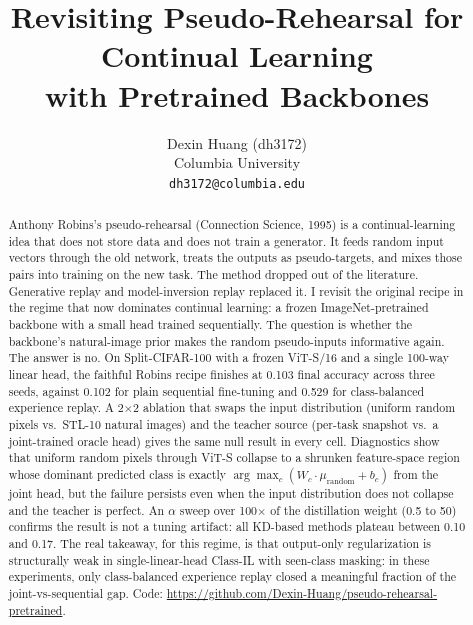 \documentclass[conference]{IEEEtran}
\begin{document}
\title{Revisiting Pseudo-Rehearsal for Continual Learning\\with Pretrained Backbones}

\author{Dexin Huang (dh3172)\\
Columbia University\\
\texttt{dh3172@columbia.edu}}

\maketitle

\begin{abstract}
Anthony Robins's pseudo-rehearsal (Connection Science, 1995) is a
continual-learning idea that does not store data and does not train a
generator. It feeds random input vectors through the old network, treats the
outputs as pseudo-targets, and mixes those pairs into training on the new
task. The method dropped out of the literature. Generative replay and
model-inversion replay replaced it. I revisit the original recipe in the
regime that now dominates continual learning: a frozen
ImageNet-pretrained backbone with a small head trained sequentially. The
question is whether the backbone's natural-image prior makes the random
pseudo-inputs informative again. The answer is no. On Split-CIFAR-100 with a
frozen ViT-S/16 and a single 100-way linear head, the faithful Robins recipe
finishes at 0.103 final accuracy across three seeds, against 0.102 for plain
sequential fine-tuning and 0.529 for class-balanced experience replay. A
2$\times$2 ablation that swaps the input distribution (uniform random pixels
vs.\ STL-10 natural images) and the teacher source (per-task snapshot vs.\ a
joint-trained oracle head) gives the same null result in every cell.
Diagnostics show that uniform random pixels through ViT-S collapse to a
shrunken feature-space region whose dominant predicted class is exactly
$\arg\max_c (W_c \cdot \mu_{\text{random}} + b_c)$ from the joint head, but
the failure persists even when the input distribution does not collapse and
the teacher is perfect. An $\alpha$ sweep over 100$\times$ of the
distillation weight (0.5 to 50) confirms the result is not a tuning artifact:
all KD-based methods plateau between 0.10 and 0.17. The real takeaway, for
this regime, is that output-only regularization is structurally weak in
single-linear-head Class-IL with seen-class masking: in these experiments,
only class-balanced experience replay closed a meaningful fraction of the
joint-vs-sequential gap. Code:
\url{https://github.com/Dexin-Huang/pseudo-rehearsal-pretrained}.
\end{abstract}
\end{document}
